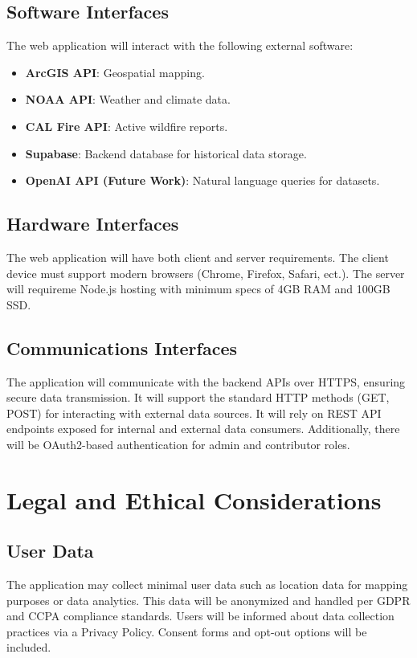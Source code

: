 \documentclass[12pt]{article}
\begin{document}
\subsection{Software Interfaces}
The web application will interact with the following external software:
\begin{itemize}
\item \textbf{ArcGIS API}: Geospatial mapping.
\item \textbf{NOAA API}: Weather and climate data.
\item \textbf{CAL Fire API}: Active wildfire reports.
\item \textbf{Supabase}: Backend database for historical data storage.
\item \textbf{OpenAI API (Future Work)}: Natural language queries for datasets.
\end{itemize}

\subsection{Hardware Interfaces}
The web application will have both client and server requirements. The client device must support modern browsers (Chrome, Firefox, Safari, ect.). The server will requireme Node.js hosting with minimum specs of 4GB RAM and 100GB SSD.

\subsection{Communications Interfaces}
The application will communicate with the backend APIs over HTTPS, ensuring secure data transmission. It will support the standard HTTP methods (GET, POST) for interacting with external data sources. It will rely on REST API endpoints exposed for internal and external data consumers. Additionally, there will be OAuth2-based authentication for admin and contributor roles.

\newpage
\section{Legal and Ethical Considerations}
\subsection{User Data}
The application may collect minimal user data such as location data for mapping purposes or data analytics. This data will be anonymized and handled per GDPR and CCPA compliance standards. Users will be informed about data collection practices via a Privacy Policy. Consent forms and opt-out options will be included.
\end{document}
